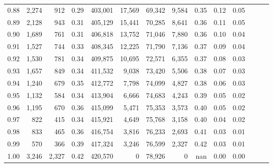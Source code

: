 \begin{tabular}{rrrrrrrrrrrrrr}
0.88 &   2,274 &    912 &  0.29 &  403,001 &   17,569 &  69,342 &   9,584 &  0.35 &  0.12 &      0.05 \\
0.89 &   2,128 &    943 &  0.31 &  405,129 &   15,441 &  70,285 &   8,641 &  0.36 &  0.11 &      0.05 \\
0.90 &   1,689 &    761 &  0.31 &  406,818 &   13,752 &  71,046 &   7,880 &  0.36 &  0.10 &      0.04 \\
0.91 &   1,527 &    744 &  0.33 &  408,345 &   12,225 &  71,790 &   7,136 &  0.37 &  0.09 &      0.04 \\
0.92 &   1,530 &    781 &  0.34 &  409,875 &   10,695 &  72,571 &   6,355 &  0.37 &  0.08 &      0.03 \\
0.93 &   1,657 &    849 &  0.34 &  411,532 &    9,038 &  73,420 &   5,506 &  0.38 &  0.07 &      0.03 \\
0.94 &   1,240 &    679 &  0.35 &  412,772 &    7,798 &  74,099 &   4,827 &  0.38 &  0.06 &      0.03 \\
0.95 &   1,132 &    584 &  0.34 &  413,904 &    6,666 &  74,683 &   4,243 &  0.39 &  0.05 &      0.02 \\
0.96 &   1,195 &    670 &  0.36 &  415,099 &    5,471 &  75,353 &   3,573 &  0.40 &  0.05 &      0.02 \\
0.97 &     822 &    415 &  0.34 &  415,921 &    4,649 &  75,768 &   3,158 &  0.40 &  0.04 &      0.02 \\
0.98 &     833 &    465 &  0.36 &  416,754 &    3,816 &  76,233 &   2,693 &  0.41 &  0.03 &      0.01 \\
0.99 &     570 &    366 &  0.39 &  417,324 &    3,246 &  76,599 &   2,327 &  0.42 &  0.03 &      0.01 \\
1.00 &   3,246 &  2,327 &  0.42 &  420,570 &        0 &  78,926 &       0 &   nan &  0.00 &      0.00 \\
\bottomrule
\end{tabular}
